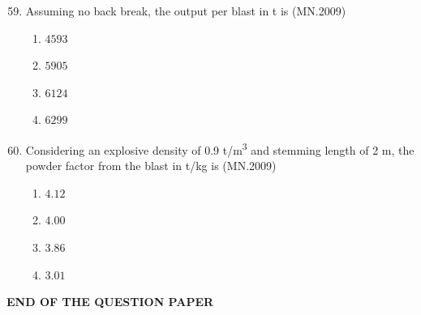 \documentclass[journal]{IEEEtran}
\numberwithin{equation}{enumi}
\numberwithin{figure}{enumi}
\begin{document}
\begin{enumerate}[label=Q.\arabic*]
\setcounter{enumi}{58}

\item Assuming no back break, the output per blast in t is  
\hfill(MN.2009)

\begin{multicols}{2}
\begin{enumerate}[label=(\Alph*)]
\item $4593$  
\item $5905$  
\item $6124$  
\item $6299$
\end{enumerate}
\end{multicols}

\item Considering an explosive density of 0.9 t/m\textsuperscript{3} and stemming length of 2 m, the powder factor from the blast in t/kg is  
\hfill(MN.2009)

\begin{multicols}{2}
\begin{enumerate}[label=(\Alph*)]
\item $4.12$  
\item $4.00$
\item $3.86$
\item $3.01$ 
\end{enumerate}
\end{multicols}

\end{enumerate}

\begin{center}
\textbf{END OF THE QUESTION PAPER}
\end{center}
\end{document}
